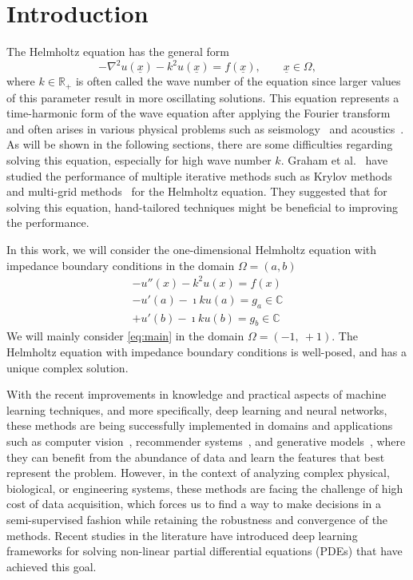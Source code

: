 \section{Introduction}

The Helmholtz equation has the general form
\begin{equation}
    \label{eq:general}
    -\nabla^2{u(\underline{x})} - k^2 u(\underline{x}) = f(\underline{x}), \qquad \underline{x} \in \Omega,
\end{equation}
where $k \in \mathbb{R}_{+}$ is often called the wave number of the equation since larger values of this parameter result in more oscillating solutions. This equation represents a time-harmonic form of the wave equation after applying the Fourier transform and often arises in various physical problems such as seismology~\cite{alkhalifah2021} and acoustics~\cite{sun2015}. As will be shown in the following sections, there are some difficulties regarding solving this equation, especially for high wave number $k$. Graham et al.~\cite{graham2012} have studied the performance of multiple iterative methods such as Krylov methods~\cite{fan2018} and multi-grid methods~\cite{xu2016} for the Helmholtz equation. They suggested that for solving this equation, hand-tailored techniques might be beneficial to improving the performance.

In this work, we will consider the one-dimensional Helmholtz equation with impedance boundary conditions in the domain $\Omega=(a, b)$
\begin{equation}
    \label{eq:main}
    \begin{aligned}
        -u''(x) - k^2 u(x) = f(x)\\
        -u'(a) - \imath k u(a) = g_a \in \mathbb{C}\\
        +u'(b) - \imath k u(b) = g_b \in \mathbb{C}
    \end{aligned}
\end{equation}
We will mainly consider \eqref{eq:main} in the domain $\Omega = (-1,\:+1)$. The Helmholtz equation with impedance boundary conditions is well-posed, and has a unique complex solution.

With the recent improvements in knowledge and practical aspects of machine learning techniques, and more specifically, deep learning and neural networks, these methods are being successfully implemented in domains and applications such as computer vision~\cite{voulodimos2018deep}, recommender systems~\cite{zhang2019deep}, and generative models~\cite{creswell2018generative}, where they can benefit from the abundance of data and learn the features that best represent the problem. However, in the context of analyzing complex physical, biological, or engineering systems, these methods are facing the challenge of high cost of data acquisition, which forces us to find a way to make decisions in a semi-supervised fashion while retaining the robustness and convergence of the methods. Recent studies in the literature have introduced deep learning frameworks for solving non-linear partial differential
equations (PDEs) that have achieved this goal.

